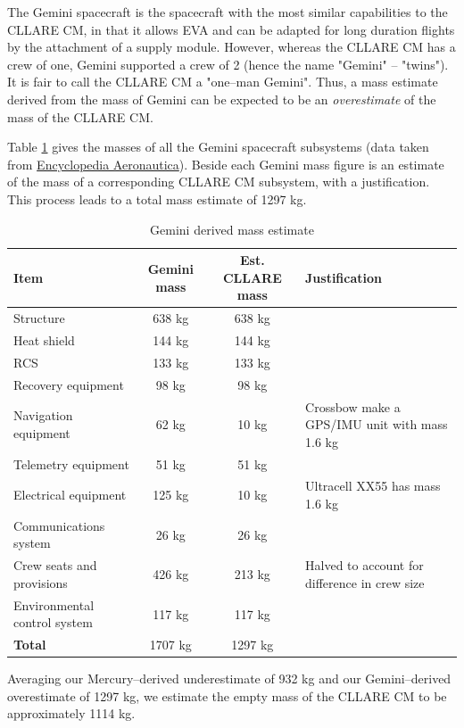 \documentclass{report}
\begin{document}
The Gemini spacecraft is the spacecraft with the most similar capabilities to the CLLARE CM, in that it allows EVA and can be adapted for long duration flights by the attachment of a supply module.  However, whereas the CLLARE CM has a crew of one, Gemini supported a crew of 2 (hence the name "Gemini" -- "twins").  It is fair to call the CLLARE CM a "one--man Gemini".  Thus, a mass estimate derived from the mass of Gemini can be expected to be an \emph{overestimate} of the mass of the CLLARE CM.

Table \ref{tab:geminimass} gives the masses of all the Gemini spacecraft subsystems (data taken from \href{http://www.astronautix.com/craft/gemini.htm}{Encyclopedia Aeronautica}).  Beside each Gemini mass figure is an estimate of the mass of a corresponding CLLARE CM subsystem, with a justification.  This process leads to a total mass estimate of 1297 kg.

\begin{table}
\centering
\begin{tabular}{|l|c|c|l|}
\hline
Item	& Gemini mass & Est. CLLARE mass & Justification \\
\hline \hline
Structure		& 638 kg	& 638 kg &  \\
Heat shield		& 144 kg	& 144 kg & \\
RCS			& 133 kg	& 133 kg & \\
Recovery equipment	& 98 kg		& 98 kg & \\
Navigation equipment	& 62 kg		& 10 kg & Crossbow make a GPS/IMU unit with mass 1.6 kg \\
Telemetry equipment	& 51 kg		& 51 kg & \\
Electrical equipment	& 125 kg		& 10 kg & Ultracell XX55 has mass 1.6 kg \\
Communications system	& 26 kg		& 26 kg & \\
Crew seats and provisions & 426 kg	& 213 kg & Halved to account for difference in crew size \\
Environmental control system	&  117 kg		& 117 kg & \\
\hline \hline
\textbf{Total}	& 1707 kg & 1297 kg	& \\
\hline
\end{tabular}
\caption{Gemini derived mass estimate}
\label{tab:geminimass}
\end{table} 

Averaging our Mercury--derived underestimate of 932 kg and our Gemini--derived overestimate of 1297 kg, we estimate the empty mass of the CLLARE CM to be approximately 1114 kg.
\end{document}

